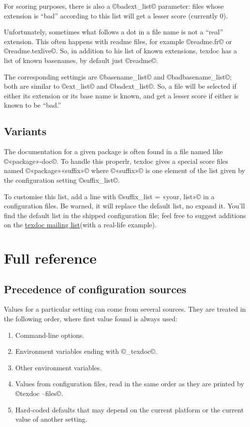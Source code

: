 \documentclass[a4paper, oneside]{scrartcl}
\makeatletter
\newcommand\tdml{\href{mailto:texdoc@tug.org}{texdoc mailing list}\xspace}
\makeatother
\begin{document}
For scoring purposes, there is also a ©badext_list© parameter: files whose
extension is ``bad'' according to this list will get a lesser score (currently
0).

Unfortunately, sometimes what follows a dot in a file name is not a ``real''
extension. This often happens with readme files, for example ©readme.fr© or
©readme.texlive©. So, in addition to his list of known extensions, texdoc has
a list of known basenames, by default just ©readme©.

The corresponding settingis are ©basename_list© and ©badbasename_list©; both
are similar to ©ext_list© and ©badext_list©. So, a file will be selected if
either its extension or its base name is known, and get a lesser score if
either is known to be ``bad.''

\subsection{Variants}\label{ss-variants}

The documentation for a given package is often found in a file named like
©«package»-doc©. To handle this properlr, texdoc gives a special score files
named ©«package»«suffix»© where ©«suffix»© is one element of the list given by
the configuration setting ©suffix_list©.

To customise this list, add a line with ©suffix_list = «your, list»© in a
configuration files. Be warned, it will replace the default list, no expand
it. You'll find the default list in the shipped configuration file; feel free
to suggest additions on the \tdml (with a real-life example).

\clearpage

\section{Full reference}

\subsection{Precedence of configuration sources}\label{ss-prec}

Values for a particular setting can come from several sources. They are treated
in the following order, where first value found is always used:
\begin{enumerate}
  \item Command-line options.
  \item Environment variables ending with ©_texdoc©.
  \item Other environment variables.
  \item Values from configuration files, read in the same order as they are
    printed by ©texdoc --files©.
  \item Hard-coded defaults that may depend on the current platform or the
    current value of another setting.
\end{enumerate}
\end{document}

